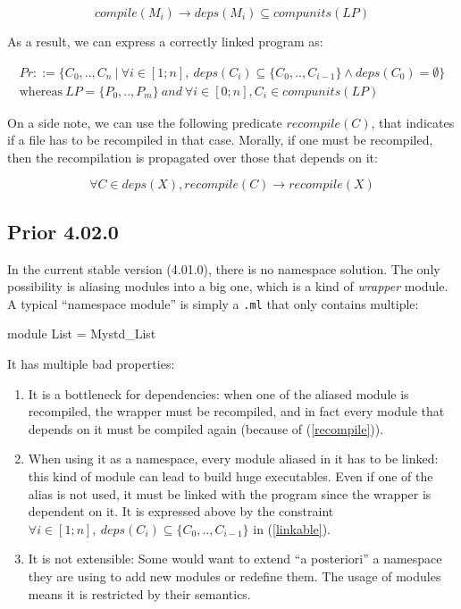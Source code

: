 \documentclass[11pt,a4paper]{article}
\begin{document}
\begin{equation}
compile(M_i) \rightarrow deps(M_i) \subseteq compunits(LP)
\label{compile}
\end{equation}

As a result, we can express a correctly linked program as:

\begin{multline}
Pr ::= \{ C_0, .., C_n ~|~ \forall i \in [1; n], ~deps(C_i) \subseteq \{ C_0, ..,
    C_{i-1} \} \land deps(C_0) = \emptyset \}\\
    \text{whereas} ~ LP = \{ P_0, .., P_m \}~and~\forall i \in [0; n], C_i \in compunits(LP)
\label{linkable}
\end{multline}


On a side note, we can use the following predicate $recompile(C)$, that
indicates if a file has to be recompiled in that case. Morally, if one must be
recompiled, then the recompilation is propagated over those that depends on it:

\begin{equation}
  \forall C \in deps(X), recompile(C) \rightarrow recompile(X)
\label{recompile}
\end{equation}

\subsection{Prior 4.02.0}

In the current stable version (4.01.0), there is no namespace solution. The only
possibility is aliasing modules into a big one, which is a kind of
\emph{wrapper} module. A typical ``namespace module'' is simply a \texttt{.ml}
that only contains multiple:

\begin{OCaml}
module List = Mystd_List
\end{OCaml}

It has multiple bad properties:
\begin{enumerate}
  \item It is a bottleneck for dependencies: when one of the aliased module is
    recompiled, the wrapper must be recompiled, and in fact every module that
    depends on it must be compiled again (because of (\ref{recompile})).
  \item When using it as a namespace, every module aliased in it has to be
    linked: this kind of module can lead to build huge executables. Even if one
    of the alias is not used, it must be linked with the program since the
    wrapper is dependent on it. It is expressed above by the constraint $
    \forall i \in [1; n], ~deps(C_i) \subseteq \{ C_0, .., C_{i-1} \}$ in
    (\ref{linkable}).
  \item It is not extensible: Some would want to extend ``a posteriori'' a
    namespace they are using to add new modules or redefine them. The usage of
    modules means it is restricted by their semantics.
\end{enumerate}
\end{document}
